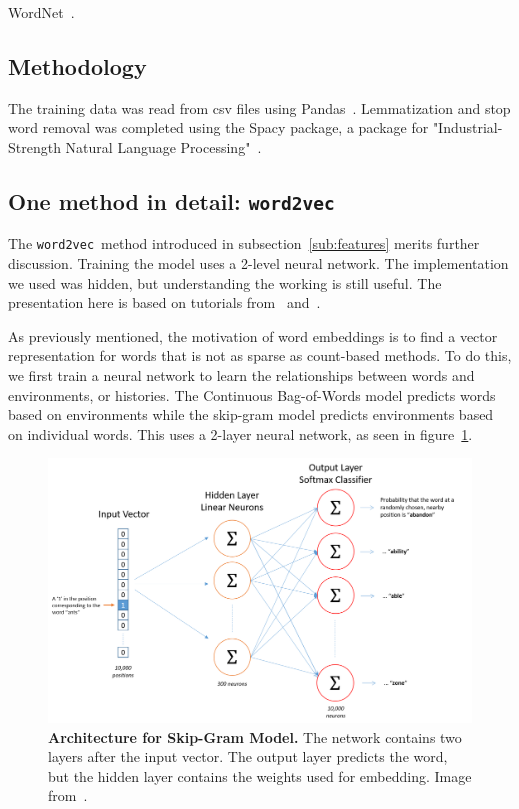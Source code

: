 \documentclass{article} %
\newcommand{\wordtvec}{\texttt{word2vec}}
\begin{document}
WordNet~\cite{wordnet}.

\subsection{Methodology}

The training data was read from csv files using Pandas~\cite{pandas}. Lemmatization and stop word removal was completed using the Spacy package, a package for "Industrial-Strength Natural Language Processing"~\cite{spacy}. 

\newpage
\subsection{One method in detail: \wordtvec} \label{sub:detail}

The \wordtvec\ method introduced in subsection~\ref{sub:features} merits further discussion. Training the model uses a 2-level neural network. The implementation we used was hidden, but understanding the working is still useful. The presentation here is based on tutorials from~\cite{tensorflow} and~\cite{mccormick}.

As previously mentioned, the motivation of word embeddings is to find a vector representation for words that is not as sparse as count-based methods. To do this, we first train a neural network to learn the relationships between words and environments, or histories. The Continuous Bag-of-Words model predicts words based on environments while the skip-gram model predicts environments based on individual words. This uses a 2-layer neural network, as seen in figure~\ref{fig:skipgram}. 

\begin{figure}[h]
	\centering
	\includegraphics[width=.5\textwidth]{skip_gram_net_arch}
	\caption{\textbf{Architecture for Skip-Gram Model.} The network contains two layers after the input vector. The output layer predicts the word, but the hidden layer contains the weights used for embedding. Image from~\cite{mccormick}.}
	\label{fig:skipgram}
\end{figure}
\end{document}

